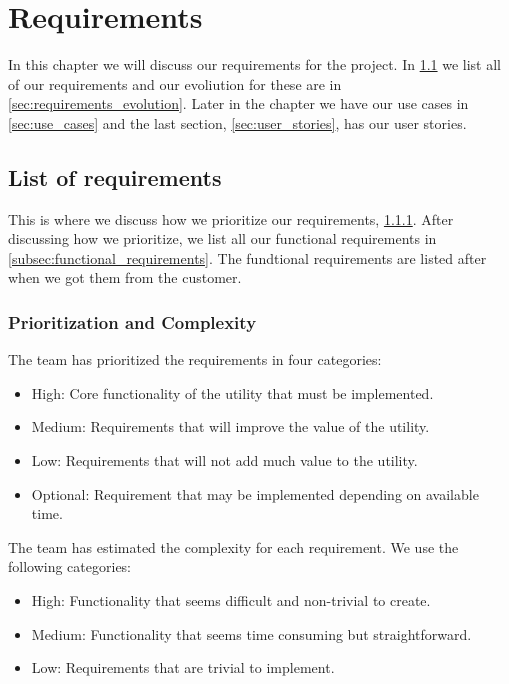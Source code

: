 \documentclass{report}
\begin{document}
\chapter{Requirements} \label{cha:requirements}
In this chapter we will discuss our requirements for the project. In \ref{sec:list_of_requirements} we list all of our requirements and our evoliution for these are in \ref{sec:requirements_evolution}. Later in the chapter we have our use cases in \ref{sec:use_cases} and the last section, \ref{sec:user_stories}, has our user stories.
\section{List of requirements} \label{sec:list_of_requirements}
This is where we discuss how we prioritize our requirements, \ref{subsec:prioritization_and_complexity}. After discussing how we prioritize, we list all our functional requirements in \ref{subsec:functional_requirements}. The fundtional requirements are listed after when we got them from the customer.
\subsection{Prioritization and Complexity} \label{subsec:prioritization_and_complexity}
The team has prioritized the requirements in four categories:
\begin{itemize}
    \item High: Core functionality of the utility that must be implemented.
    \item Medium: Requirements that will improve the value of the utility.
    \item Low: Requirements that will not add much value to the utility.
    \item Optional: Requirement that may be implemented depending on available time.
\end{itemize}
The team has estimated the complexity for each requirement. We use the following categories:
\begin{itemize}
    \item High: Functionality that seems difficult and non-trivial to create.
    \item Medium: Functionality that seems time consuming but straightforward.
    \item Low: Requirements that are trivial to implement.
\end{itemize}   
\end{document}
